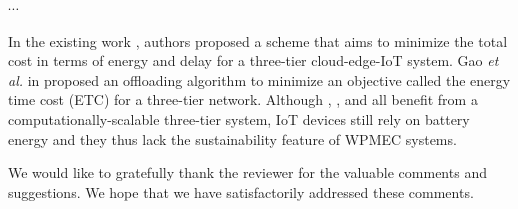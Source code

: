 \documentclass[12pt,draftclsnofoot,onecolumn]{IEEEtran}
\newenvironment{my}[2]%
{\begin{list}{}%
{\setlength{\rightmargin}{#1}\setlength{\leftmargin}{#2}}%


 \item[]{}

} {\end{list}}
\begin{document}
\begin{enumerate}
\begin{my}{1cm}{1cm}
{			$\cdots$
			
			In the existing work \cite{b39}, authors proposed a scheme that aims to minimize the total cost in terms of energy and delay for a three-tier cloud-edge-IoT system. Gao \textit{et al.} in \cite{b40} proposed an offloading algorithm to minimize an objective called the energy time cost (ETC) for a three-tier network. Although \cite{b5}, \cite{b39}, and \cite{b40} all benefit from a computationally-scalable three-tier system, IoT devices still rely on battery energy and they thus lack the sustainability feature of WPMEC systems.
			\\}
	\end{my}
	
\end{enumerate}

We would like to gratefully thank the reviewer for the valuable comments and suggestions. We hope that we have satisfactorily addressed these comments.\newline
\end{document}

